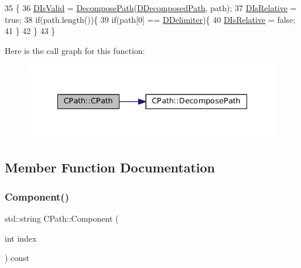 \begin{DoxyCode}
35                                  \{
36     \hyperlink{classCPath_a992aca27a1cba1c3bae3d04438821192}{DIsValid} = \hyperlink{classCPath_aae05f3c3502e92bf68d5ce71264c7bb9}{DecomposePath}(\hyperlink{classCPath_a03ed25209a01e633c107a0c877fc61f8}{DDecomposedPath}, path);
37     \hyperlink{classCPath_af705ff149bb2281c67afb84fff550eb9}{DIsRelative} = \textcolor{keyword}{true};
38     \textcolor{keywordflow}{if}(path.length())\{
39         \textcolor{keywordflow}{if}(path[0] == \hyperlink{classCPath_a4af2d74fc7695c4de8900dcc426530b5}{DDelimiter})\{
40             \hyperlink{classCPath_af705ff149bb2281c67afb84fff550eb9}{DIsRelative} = \textcolor{keyword}{false};   
41         \}
42     \}
43 \}
\end{DoxyCode}
Here is the call graph for this function\+:
\nopagebreak
\begin{figure}[H]
\begin{center}
\leavevmode
\includegraphics[width=335pt]{classCPath_aceb476f21440713272cf0ef38f2619c6_cgraph}
\end{center}
\end{figure}


\subsection{Member Function Documentation}
\hypertarget{classCPath_a7396f770babe0fbea344afa76d31da7c}{}\label{classCPath_a7396f770babe0fbea344afa76d31da7c} 
\subsubsection{\texorpdfstring{Component()}{Component()}}
{\footnotesize\ttfamily std\+::string C\+Path\+::\+Component (\begin{DoxyParamCaption}\item[{int}]{index }\end{DoxyParamCaption}) const\hspace{0.3cm}{\ttfamily [inline]}}



